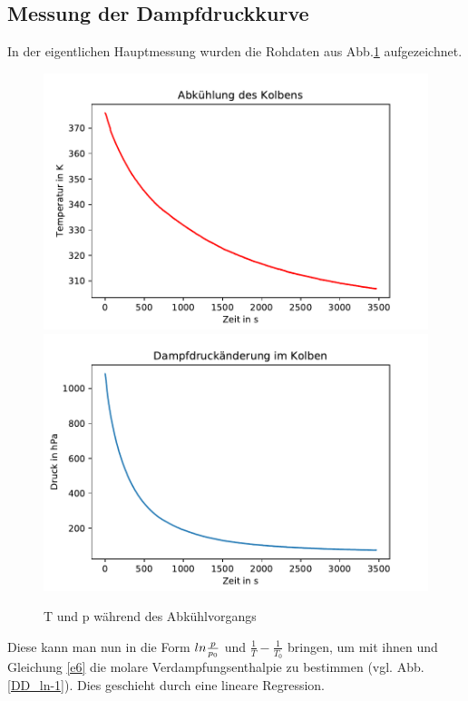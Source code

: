 \documentclass[]{article}
\begin{document}
	\subsection{Messung der Dampfdruckkurve}
	In der eigentlichen Hauptmessung wurden die Rohdaten aus Abb.\ref{DD_Roh} aufgezeichnet.\\
	\begin{figure}
		\begin{center}
			\includegraphics[scale=0.45]{Images/Dampfdruck_T.pdf}
			\includegraphics[scale=0.45]{Images/Dampfdruck_p.pdf}
			\caption{T und p während des Abkühlvorgangs}
			\label{DD_Roh}
		\end{center}
	\end{figure}
	Diese kann man nun in die Form $ln\frac{p}{p_0\\}$ und $\frac{1}{T} - \frac{1}{T_0}$ bringen, um mit ihnen und Gleichung \ref{e6} die molare Verdampfungsenthalpie zu bestimmen (vgl. Abb. \ref{DD_ln-1}). Dies geschieht durch eine lineare Regression. 
\end{document}
